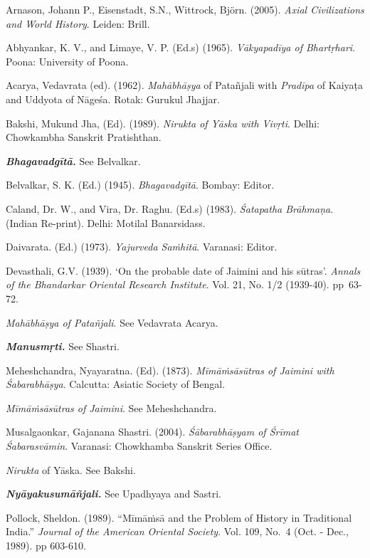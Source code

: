 \begin{thebibliography}{99}
 Arnason, Johann P., Eisenstadt, S.N., Wittrock, Björn. (2005). \textit{Axial Civilizations and World History}. Leiden: Brill. 

  Abhyankar, K. V., and Limaye, V. P. (Ed.s) (1965). \textit{Vākyapadīya of Bhartṛhari}. Poona: University of Poona.

  Acarya, Vedavrata (ed). (1962). \textit{Mahābhāṣya} of Patañjali with \textit{Pradīpa} of Kaiyaṭa and Uddyota of Nāgeśa. Rotak: Gurukul Jhajjar.

  Bakshi, Mukund Jha, (Ed). (1989). \textit{Nirukta of Yāska with Vivṛti}. Delhi: Chowkambha Sanskrit Pratishthan.

  \textbf{\textit{Bhagavadgītā.}} See Belvalkar.

  Belvalkar, S. K. (Ed.) (1945). \textit{Bhagavadgītā}. Bombay: Editor.

  Caland, Dr. W., and Vira, Dr. Raghu. (Ed.s) (1983). \textit{Śatapatha Brāhmaṇa}. (Indian Re-print). Delhi: Motilal Banarsidass.

  Daivarata. (Ed.) (1973). \textit{Yajurveda Saṁhitā}. Varanasi: Editor.

  Devasthali, G.V. (1939). ‘On the probable date of Jaimini and his sūtras’. \textit{Annals of the Bhandarkar Oriental Research Institute}. Vol. 21, No. 1/2 (1939-40). pp~63-72.

  \textit{Mahābhāṣya of Patañjali}. See Vedavrata Acarya.

  \textbf{\textit{Manusmṛti.}} See Shastri.

  Meheshchandra, Nyayaratna. (Ed). (1873). \textit{Mīmāṁsāsūtras of Jaimini with Śabarabhāṣya}. Calcutta: Asiatic Society of Bengal.

  \textit{Mīmāṁsāsūtras of Jaimini}. See Meheshchandra.

  Musalgaonkar, Gajanana Shastri. (2004). \textit{Śābarabhāṣyam of Śrīmat Śabarasvāmin}. Varanasi: Chowkhamba Sanskrit Series Office.

  \textit{Nirukta} of Yāska. See Bakshi.

  \textbf{\textit{Nyāyakusumāñjali.}} See Upadhyaya and Sastri.

  Pollock, Sheldon. (1989). “Mīmāṁsā and the Problem of History in Traditional India.” \textit{Journal of the American Oriental Society}. Vol. 109, No.~4 (Oct. - Dec., 1989). pp 603-610.


\end{thebibliography}
